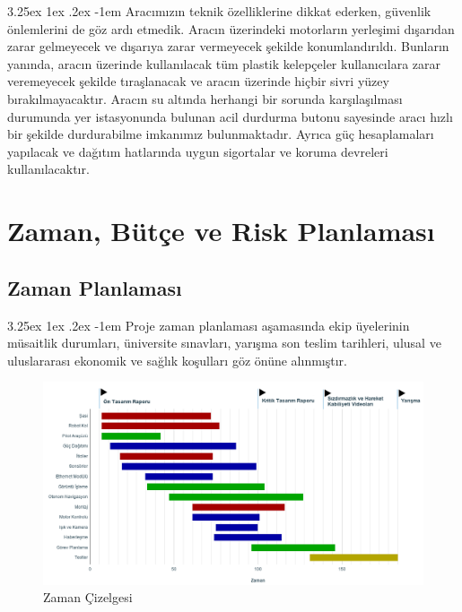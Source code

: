\documentclass[12pt]{article}
\makeatletter
\renewcommand\paragraph{\@startsection{paragraph}{5}{\z@}%
  {3.25ex \@plus1ex \@minus.2ex}%
  {-1em}%
  {\normalfont\normalsize\bfseries}}
\makeatother
\begin{document}
\paragraph{} Aracımızın teknik özelliklerine dikkat ederken, güvenlik önlemlerini de göz ardı etmedik. Aracın üzerindeki motorların yerleşimi dışarıdan zarar gelmeyecek ve dışarıya zarar vermeyecek şekilde konumlandırıldı. Bunların yanında, aracın üzerinde kullanılacak tüm plastik kelepçeler kullanıcılara zarar veremeyecek şekilde tıraşlanacak ve aracın üzerinde hiçbir sivri yüzey bırakılmayacaktır. Aracın su altında herhangi bir sorunda karşılaşılması durumunda yer istasyonunda bulunan acil durdurma butonu sayesinde aracı hızlı bir şekilde durdurabilme imkanımız bulunmaktadır. Ayrıca güç hesaplamaları yapılacak ve dağıtım hatlarında uygun sigortalar ve koruma devreleri kullanılacaktır.


\section{Zaman, Bütçe ve Risk Planlaması}
\subsection{Zaman Planlaması}
\paragraph{} Proje zaman planlaması aşamasında ekip üyelerinin müsaitlik durumları, üniversite sınavları, yarışma son teslim tarihleri, ulusal ve uluslararası ekonomik ve sağlık koşulları göz önüne alınmıştır. 

\begin{figure}[hbt!]
\centering
\includegraphics[width=1\textwidth]{images/chart-final.png}
\caption{Zaman Çizelgesi}
\label{fig:gantt-chart}
\end{figure}
\end{document}
